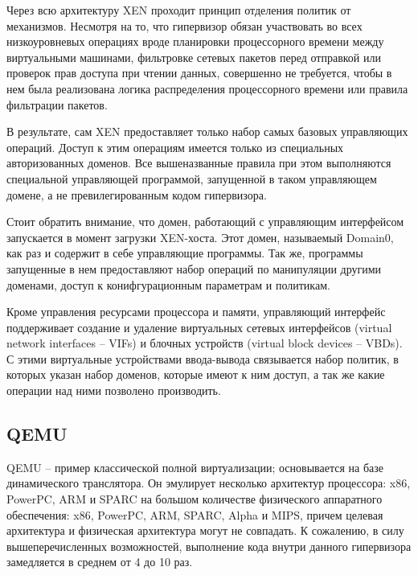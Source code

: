 Через всю архитектуру XEN проходит принцип отделения политик от механизмов. Несмотря на
то, что гипервизор обязан участвовать во всех низкоуровневых операциях вроде планировки
процессорного времени между виртуальными машинами, фильтровке сетевых пакетов перед
отправкой или проверок прав доступа при чтении данных, совершенно не требуется, чтобы 
в нем была реализована логика распределения процессорного времени или правила фильтрации
пакетов.

В результате, сам XEN предоставляет только набор самых базовых управляющих операций.
Доступ к этим операциям имеется только из специальных авторизованных доменов. Все 
вышеназванные правила при этом выполняются специальной управляющей программой, 
запущенной в таком управляющем домене, а не превилегированным кодом гипервизора.

Стоит обратить внимание, что домен, работающий с управляющим интерфейсом запускается
в момент загрузки XEN-хоста. Этот домен, называемый Domain0, как раз и содержит в себе
управляющие программы. Так же, программы запущенные в нем предоставляют набор операций
по манипуляции другими доменами, доступ к конифгурационным параметрам и политикам.

Кроме управления ресурсами процессора и памяти, управляющий интерфейс поддерживает
создание и удаление виртуальных сетевых интерфейсов (virtual network interfaces -- VIFs) и 
блочных устройств (virtual block devices -- VBDs). С этими виртуальные устройствами ввода-вывода
связывается набор политик, в которых указан набор доменов, которые имеют к ним доступ,
а так же какие операции над ними позволено производить.
\cite{Barham:2003:XAV:1165389.945462}

\subsection{QEMU}

QEMU -- пример классической полной виртуализации; основывается на базе динамического
транслятора. Он эмулирует несколько архитектур процессора: x86, PowerPC, ARM и SPARC на
большом количестве физического аппаратного обеспечения: x86, PowerPC, ARM, SPARC, Alpha
и MIPS, причем целевая архитектура и физическая архитектура могут не совпадать. К сожалению,
в силу вышеперечисленных возможностей, выполнение кода внутри данного гипервизора
замедляется в среднем от 4 до 10 раз.\cite{Bellard:2005:QFP:1247360.1247401}

